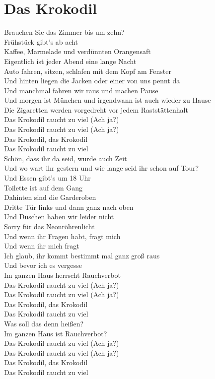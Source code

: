 \documentclass[]{book}
\begin{document}
\hypertarget{das-krokodil-2}{%
\section{Das Krokodil}\label{das-krokodil-2}}

Brauchen Sie das Zimmer bis um zehn?\\
Frühstück gibt's ab acht\\
Kaffee, Marmelade und verdünnten Orangensaft\\
Eigentlich ist jeder Abend eine lange Nacht\\
Auto fahren, sitzen, schlafen mit dem Kopf am Fenster\\
Und hinten liegen die Jacken oder einer von uns pennt da\\
Und manchmal fahren wir raus und machen Pause\\
Und morgen ist München und irgendwann ist auch wieder zu Hause\\
Die Zigaretten werden vorgedreht vor jedem Raststättenhalt\\
Das Krokodil raucht zu viel (Ach ja?)\\
Das Krokodil raucht zu viel (Ach ja?)\\
Das Krokodil, das Krokodil\\
Das Krokodil raucht zu viel\\
Schön, dass ihr da seid, wurde auch Zeit\\
Und wo wart ihr gestern und wie lange seid ihr schon auf Tour?\\
Und Essen gibt's um 18 Uhr\\
Toilette ist auf dem Gang\\
Dahinten sind die Garderoben\\
Dritte Tür links und dann ganz nach oben\\
Und Duschen haben wir leider nicht\\
Sorry für das Neonröhrenlicht\\
Und wenn ihr Fragen habt, fragt mich\\
Und wenn ihr mich fragt\\
Ich glaub, ihr kommt bestimmt mal ganz groß raus\\
Und bevor ich es vergesse\\
Im ganzen Haus herrscht Rauchverbot\\
Das Krokodil raucht zu viel (Ach ja?)\\
Das Krokodil raucht zu viel (Ach ja?)\\
Das Krokodil, das Krokodil\\
Das Krokodil raucht zu viel\\
Was soll das denn heißen?\\
Im ganzen Haus ist Rauchverbot?\\
Das Krokodil raucht zu viel (Ach ja?)\\
Das Krokodil raucht zu viel (Ach ja?)\\
Das Krokodil, das Krokodil\\
Das Krokodil raucht zu viel
\end{document}
